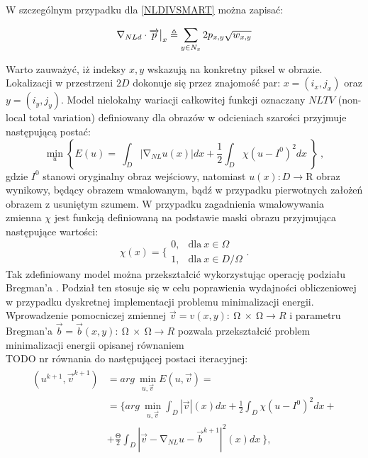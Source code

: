 \documentclass[12pt, twoside, openany]{report}
\theoremstyle{definition}
\begin{document}
W szczególnym przypadku dla \eqref{NLDIVSMART} można zapisać:
\begin{large}
\begin{equation}
{\mathrm{\nabla }}_{NLd}\cdot \overrightarrow{p}\big|_x \triangleq \sum_{ 
y\in N_x \\ 
}{2p_{x,y}}\sqrt{w_{x,y}}
\label{DNLDIVSMART}
\end{equation}
\end{large}
Warto zauważyć, iż indeksy $x,y$ wskazują na konkretny piksel w obrazie. Lokalizacji w przestrzeni $2D$ dokonuje się przez znajomość par: $x=(i_x,j_x)$ oraz $y=(i_y,j_y)$.
Model nielokalny wariacji całkowitej funkcji oznaczany $NLTV$ (non-local total variation) definiowany dla obrazów w odcieniach szarości przyjmuje następującą postać:
\begin{equation}
{\mathop{\mathrm{min}}_{u} \left\{E\left(u\right)=\ \int_D{\left|{\mathrm{\nabla }}_{NL}u(x)\right|}dx+\frac{1}{2}\int_D{\chi{\left(u-I^0\right)}^2}dx\ \right\}\ }
\label{NLTVGRAY}
,
\end{equation}
gdzie $I^0$ stanowi oryginalny obraz wejściowy, natomiast $u\left(x\right):D\mathrm{\longrightarrow }\mathrm{R}$ obraz wynikowy, będący obrazem wmalowanym, bądź w przypadku pierwotnych założeń obrazem z usuniętym szumem. W przypadku zagadnienia wmalowywania zmienna ${\chi }$ jest funkcją definiowaną na podstawie maski obrazu przyjmująca następujące wartości:
\begin{equation}
\chi \left(x\right)=\Bigg\{ \begin{array}{ll}
0, & \text{dla} \ x \in \Omega \\ 
1, & \text{dla} \ x \in D/ \Omega \end{array}
\label{maskFunction}
.
\end{equation}
Tak zdefiniowany model można przekształcić wykorzystując operację podziału Bregman’a \cite{bresson2009short}. Podział ten stosuje się w celu poprawienia wydajności obliczeniowej w przypadku dyskretnej implementacji problemu minimalizacji energii. Wprowadzenie pomocniczej zmiennej $\overrightarrow{v}=v\left(x,y\right):\ \mathrm{\Omega }\mathrm{\ } \times \ \mathrm{\Omega }\longrightarrow R$ i parametru Bregman’a $\overrightarrow{b}=\overrightarrow{b}\left(x,y\right):\ \mathrm{\Omega }\mathrm{\ }\times \ \mathrm{\Omega }\longrightarrow R$ pozwala przekształcić problem minimalizacji energii opisanej równaniem \\TODO nr równania do następującej postaci iteracyjnej:
\begin{align}
\begin{aligned}
\left(u^{k+1},{\overrightarrow{v}}^{k+1}\right) &= arg\ \mathop{\mathrm{min}}_{u,\overrightarrow{v}} E\left(u,\overrightarrow{v}\right)=\\ 
&= \biggl\{arg\ \mathop{\mathrm{min}}_{u,\overrightarrow{v}}
\int_D{|\overrightarrow{v}|\left(x\right)}dx+\frac{1}{2}\int_D{{\chi }{\left(u-I^0\right)}^2}dx+\\
&+  \frac{\mathrm{\Theta }}{2}\int_D{{\left|\overrightarrow{v}-{\mathrm{\nabla }}_{NL}u-{\overrightarrow{b}}^{k+1}\right|}^2(x)}dx\ \biggr\},
\end{aligned}
\label{NLTVGRAYMINPROB}
\end{align}
\end{document}
